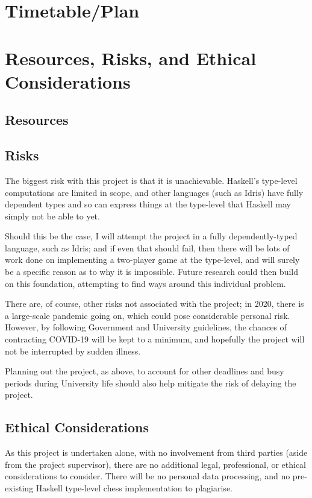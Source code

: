 \documentclass[12pt, a4paper]{scrartcl}
\begin{document}
\section{Timetable/Plan}


\section{Resources, Risks, and Ethical Considerations}

\subsection{Resources}

\subsection{Risks}

The biggest risk with this project is that it is unachievable. Haskell's type-level computations are limited in scope, and other languages (such as Idris) have fully dependent types and so can express things at the type-level that Haskell may simply not be able to yet.

Should this be the case, I will attempt the project in a fully dependently-typed language, such as Idris; and if even that should fail, then there will be lots of work done on implementing a two-player game at the type-level, and will surely be a specific reason as to why it is impossible. Future research could then build on this foundation, attempting to find ways around this individual problem.

There are, of course, other risks not associated with the project; in 2020, there is a large-scale pandemic going on, which could pose considerable personal risk. However, by following Government and University guidelines, the chances of contracting COVID-19 will be kept to a minimum, and hopefully the project will not be interrupted by sudden illness.

Planning out the project, as above, to account for other deadlines and busy periods during University life should also help mitigate the risk of delaying the project.

\subsection{Ethical Considerations}

As this project is undertaken alone, with no involvement from third parties (aside from the project supervisor), there are no additional legal, professional, or ethical considerations to consider. There will be no personal data processing, and no pre-existing Haskell type-level chess implementation to plagiarise.
\end{document}

